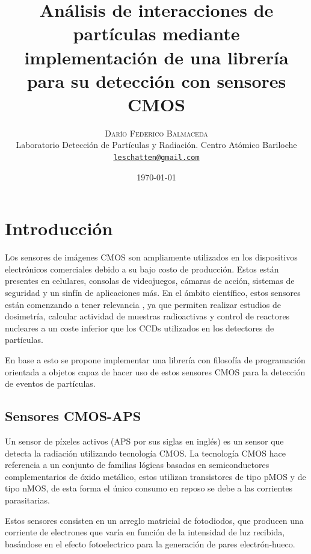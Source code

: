 \documentclass[twoside,twocolumn]{article}
\title{Análisis de interacciones de partículas mediante implementación de una librería para su detección con sensores CMOS}
\author{%
    \textsc{Darío Federico Balmaceda} \\[1ex]     %
    \normalsize Laboratorio Detección de Partículas y Radiación. Centro Atómico Bariloche \\        %
    \normalsize \href{mailto:leschatten@gmail.com}{\texttt{leschatten@gmail.com}}                   %
  }
\date{\today}
\begin{document}
  
  \maketitle              %
  
  \section{Introducción}\label{sec:intro}
    \lettrine[nindent=0em,lines=3]{L}os sensores de imágenes CMOS son ampliamente utilizados en los dispositivos electrónicos comerciales
    debido a su bajo costo de producción. Estos están presentes en celulares, consolas de videojuegos, cámaras de acción,
    sistemas de seguridad y un sinfín de aplicaciones más.
    En el ámbito científico, estos sensores están comenzando a tener relevancia \cite{PerezCMOS},
    ya que permiten realizar estudios de dosimetría, calcular actividad de muestras radioactivas y control de reactores nucleares
    a un coste inferior que los CCDs utilizados en los detectores de partículas. %

    En base a esto se propone implementar una librería con filosofía de programación orientada a objetos
    capaz de hacer uso de estos sensores CMOS para la detección de eventos de partículas.


    \subsection{Sensores CMOS-APS}\label{sec:intro:CMOS_sensor}
      Un sensor de píxeles activos (APS por sus siglas en inglés) es un sensor que detecta la radiación utilizando tecnología CMOS.
      La tecnología CMOS hace referencia a un conjunto de familias lógicas basadas en semiconductores complementarios de óxido metálico,
      estos utilizan transistores de tipo pMOS y de tipo nMOS, de esta forma el único consumo en reposo se debe a las corrientes parasitarias.

      Estos sensores consisten en un arreglo matricial de fotodiodos,
      que producen una corriente de electrones que varía en función de la intensidad de luz recibida,
      basándose en el efecto fotoelectrico para la generación de pares electrón-hueco.
      
\end{document}
